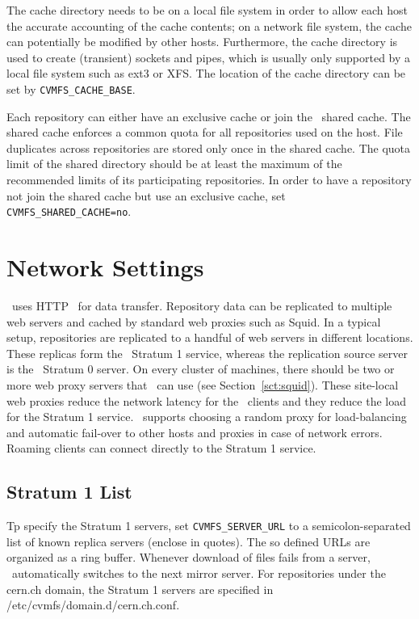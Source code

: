 The cache directory needs to be on a local file system in order to allow each host the accurate accounting of the cache contents; on a network file system, the cache can potentially be modified by other hosts.
Furthermore, the cache directory is used to create (transient) sockets and pipes, which is usually only supported by a local file system such as ext3 or XFS.
The location of the cache directory can be set by \texttt{CVMFS\_CACHE\_BASE}.

Each repository can either have an exclusive cache or join the \cvmfs\ shared cache.
The shared cache enforces a common quota for all repositories used on the host.
File duplicates across repositories are stored only once in the shared cache.
The quota limit of the shared directory should be at least the maximum of the recommended limits of its participating repositories.
In order to have a repository not join the shared cache but use an exclusive cache, set \texttt{CVMFS\_SHARED\_CACHE=no}.

\section{Network Settings}
\label{sct:config:network}
\cvmfs\ uses HTTP~\cite{rfc1945,rfc2616} for data transfer.
Repository data can be replicated to multiple web servers and cached by standard web proxies such as Squid.
In a typical setup, repositories are replicated to a handful of web servers in different locations.
These replicas form the \cvmfs\ Stratum 1 service, whereas the replication source server is the \cvmfs\ Stratum 0 server.
On every cluster of machines, there should be two or more web proxy servers that \cvmfs\ can use (see Section~\ref{sct:squid}).
These site-local web proxies reduce the network latency for the \cvmfs\ clients and they reduce the load for the Stratum 1 service.
\cvmfs\ supports choosing a random proxy for load-balancing and automatic fail-over to other hosts and proxies in case of network errors.
Roaming clients can connect directly to the Stratum 1 service.

\subsection{Stratum 1 List}
Tp specify the Stratum 1 servers, set \texttt{CVMFS\_SERVER\_URL} to a semicolon-separated list of known replica servers (enclose in quotes). 
The so defined URLs are organized as a ring buffer.
Whenever download of files fails from a server, \cvmfs\ automatically switches to the next mirror server.
For repositories under the cern.ch domain, the Stratum 1 servers are specified in /etc/cvmfs/domain.d/cern.ch.conf.

